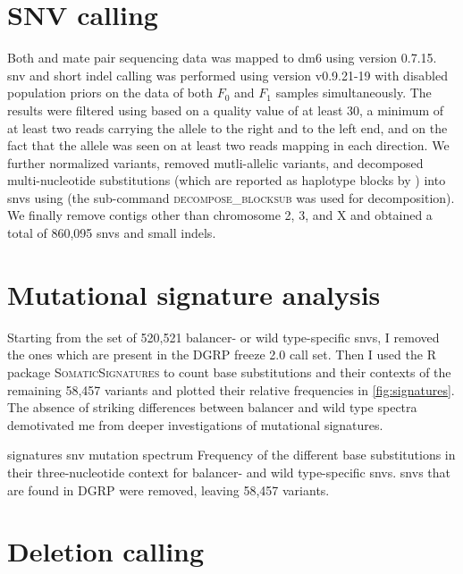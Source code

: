 \section{SNV calling}
\label{sec:suppl_snv}

Both \wgs and mate pair sequencing data was mapped to
\ac{dm6} using \bwamem version 0.7.15. \Ac{snv} and short indel calling was
performed using \freebayes version v0.9.21-19 with disabled population priors on
the \wgs data of both $F_0$ and $F_1$ samples simultaneously. The results were
filtered using \vcflib based on a quality value of at least 30,
a minimum of at least two reads carrying the allele to the right and to the left
end, and on the fact that the allele was seen on at least two reads mapping in
each direction. We further normalized variants, removed mutli-allelic variants,
and decomposed multi-nucleotide substitutions (which are reported as haplotype
blocks by \freebayes) into \acp{snv} using \vt (the sub-command \textsc{decompose\_blocksub}
was used for decomposition). We finally remove contigs other than chromosome 2,
3, and X and obtained a total of 860,095 \acp{snv} and small indels.



\section{Mutational signature analysis}
\label{sec:suppl_mutsign}

Starting from the set of 520,521 balancer- or wild type-specific \acp{snv},
I removed the ones which are present in the DGRP freeze 2.0 \snv call set.
Then I used the R package \textsc{SomaticSignatures} \citep{Gehring2015} to
count base substitutions and their contexts of the remaining 58,457 variants
and plotted their relative frequencies in \cref{fig:signatures}. The absence
of striking differences between balancer and wild type spectra demotivated me
from deeper investigations of mutational signatures.

    {signatures}
    {\Ac{snv} mutation spectrum}
    {Frequency of the different
     base substitutions in their three-nucleotide context for balancer- and
     wild type-specific \acp{snv}. \Acp{snv} that are found in DGRP were
     removed, leaving 58,457 variants.}




\section{Deletion calling}
\label{sec:suppl_del}

